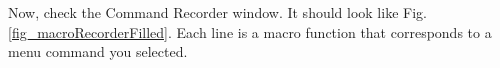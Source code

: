 Now, check the Command Recorder window. 
It should look like Fig. \ref{fig_macroRecorderFilled}. 
Each line is a macro function that corresponds to a menu command you selected.